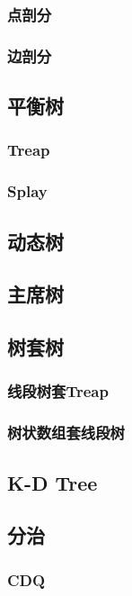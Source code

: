 \documentclass[twocolumn,a4]{article}
\newcommand{\addcpp}[1]{}
\begin{document}
		\subsubsection{点剖分}
			\addcpp{datastruct/heavy_light_decomposition}
		\subsubsection{边剖分}
	\subsection{平衡树}
		\subsubsection{Treap}
			\addcpp{datastruct/treap}
		\subsubsection{Splay}
	\subsection{动态树}
	\subsection{主席树}
		\addcpp{datastruct/perSeg}
	\subsection{树套树}
		\subsubsection{线段树套Treap}
			\addcpp{datastruct/seg_treap}
		\subsubsection{树状数组套线段树}
			\addcpp{datastruct/fenwick_seg}
	\subsection{K-D Tree}
	\subsection{分治}
		\subsubsection{CDQ}
\end{document}
